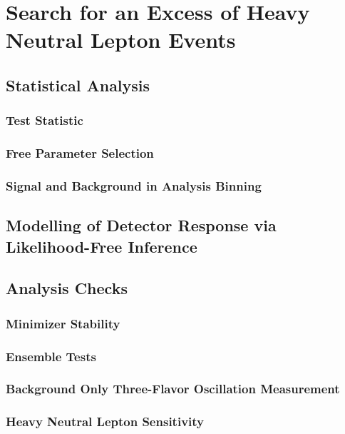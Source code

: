\setchapterpreamble[u]{\margintoc}

\chapter{Search for an Excess of Heavy Neutral Lepton Events}


\section{Statistical Analysis} 

\subsection{Test Statistic}

\subsection{Free Parameter Selection}

\subsection{Signal and Background in Analysis Binning}


\section{Modelling of Detector Response via Likelihood-Free Inference}


\section{Analysis Checks}

\subsection{Minimizer Stability}

\subsection{Ensemble Tests}

\subsection{Background Only Three-Flavor Oscillation Measurement}

\subsection{Heavy Neutral Lepton Sensitivity}



